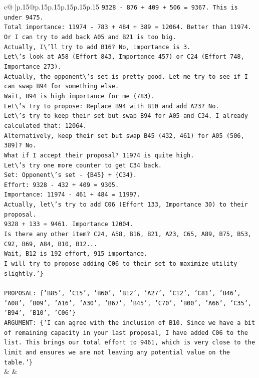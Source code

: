 \documentclass{article}
\begin{document}
{\begin{supertabular}{c@{$\;$}|p{.15\linewidth}@{}p{.15\linewidth}p{.15\linewidth}p{.15\linewidth}p{.15\linewidth}p{.15\linewidth}}
{{{\texttt{9328 {-} 876 + 409 + 506 = 9367. This is under 9475.} \\
\texttt{Total importance: 11974 {-} 783 + 484 + 389 = 12064. Better than 11974.} \\
\texttt{Or I can try to add back A05 and B21 is too big. } \\
\texttt{Actually, I\textbackslash{}'ll try to add B16? No, importance is 3. } \\
\texttt{Let\textbackslash{}'s look at A58 (Effort 843, Importance 457) or C24 (Effort 748, Importance 273).} \\
\texttt{Actually, the opponent\textbackslash{}'s set is pretty good. Let me try to see if I can swap B94 for something else.} \\
\texttt{Wait, B94 is high importance for me (783). } \\
\texttt{Let\textbackslash{}'s try to propose: Replace B94 with B10 and add A23? No.} \\
\texttt{Let\textbackslash{}'s try to keep their set but swap B94 for A05 and C34. I already calculated that: 12064.} \\
\texttt{Alternatively, keep their set but swap B45 (432, 461) for A05 (506, 389)? No.} \\
\texttt{What if I accept their proposal? 11974 is quite high.} \\
\texttt{Let\textbackslash{}'s try one more counter to get C34 back. } \\
\texttt{Set: Opponent\textbackslash{}'s set {-} \{B45\} + \{C34\}.} \\
\texttt{Effort: 9328 {-} 432 + 409 = 9305.} \\
\texttt{Importance: 11974 {-} 461 + 484 = 11997.} \\
\texttt{Actually, let\textbackslash{}'s try to add C06 (Effort 133, Importance 30) to their proposal.} \\
\texttt{9328 + 133 = 9461. Importance 12004.} \\
\texttt{Is there any other item? C24, A58, B16, B21, A23, C65, A89, B75, B53, C92, B69, A84, B10, B12...} \\
\texttt{Wait, B12 is 192 effort, 915 importance. } \\
\texttt{I will try to propose adding C06 to their set to maximize utility slightly.'\}} \\
\\ 
\texttt{PROPOSAL: \{'B85', 'C15', 'B60', 'B12', 'A27', 'C12', 'C81', 'B46', 'A08', 'B09', 'A16', 'A30', 'B67', 'B45', 'C70', 'B00', 'A66', 'C35', 'B94', 'B10', 'C06'\}} \\
\texttt{ARGUMENT: \{'I can agree with the inclusion of B10. Since we have a bit of remaining capacity in your last proposal, I have added C06 to the list. This brings our total effort to 9461, which is very close to the limit and ensures we are not leaving any potential value on the table.'\}} \\
            }
        }
    }
    & & \\ \\


\end{supertabular}}
\end{document}
